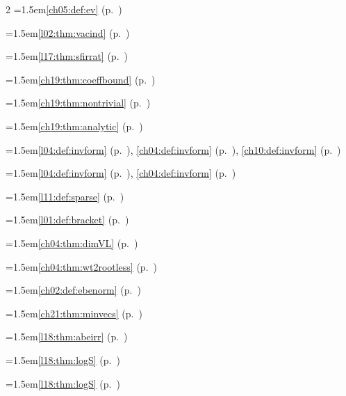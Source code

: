 \begin{multicols}{2}
\hangindent=1.5em\quad \ref{ch05:def:ev} (p.~\pageref{ch05:def:ev})\par
\hangindent=1.5em\quad \ref{l02:thm:vacind} (p.~\pageref{l02:thm:vacind})\par
\hangindent=1.5em\quad \ref{l17:thm:sfirrat} (p.~\pageref{l17:thm:sfirrat})\par
\hangindent=1.5em\quad \ref{ch19:thm:coeffbound} (p.~\pageref{ch19:thm:coeffbound})\par
\hangindent=1.5em\quad \ref{ch19:thm:nontrivial} (p.~\pageref{ch19:thm:nontrivial})\par
\hangindent=1.5em\quad \ref{ch19:thm:analytic} (p.~\pageref{ch19:thm:analytic})\par
\hangindent=1.5em\quad \ref{l04:def:invform} (p.~\pageref{l04:def:invform}), \ref{ch04:def:invform} (p.~\pageref{ch04:def:invform}), \ref{ch10:def:invform} (p.~\pageref{ch10:def:invform})\par
\hangindent=1.5em\quad \ref{l04:def:invform} (p.~\pageref{l04:def:invform}), \ref{ch04:def:invform} (p.~\pageref{ch04:def:invform})\par
\hangindent=1.5em\quad \ref{l11:def:sparse} (p.~\pageref{l11:def:sparse})\par
\hangindent=1.5em\quad \ref{l01:def:bracket} (p.~\pageref{l01:def:bracket})\par
\hangindent=1.5em\quad \ref{ch04:thm:dimVL} (p.~\pageref{ch04:thm:dimVL})\par
\hangindent=1.5em\quad \ref{ch04:thm:wt2rootless} (p.~\pageref{ch04:thm:wt2rootless})\par
\hangindent=1.5em\quad \ref{ch02:def:ebenorm} (p.~\pageref{ch02:def:ebenorm})\par
\hangindent=1.5em\quad \ref{ch21:thm:minvecs} (p.~\pageref{ch21:thm:minvecs})\par
\hangindent=1.5em\quad \ref{l18:thm:abeirr} (p.~\pageref{l18:thm:abeirr})\par
\hangindent=1.5em\quad \ref{l18:thm:logS} (p.~\pageref{l18:thm:logS})\par
\hangindent=1.5em\quad \ref{l18:thm:logS} (p.~\pageref{l18:thm:logS})\par

\end{multicols}
